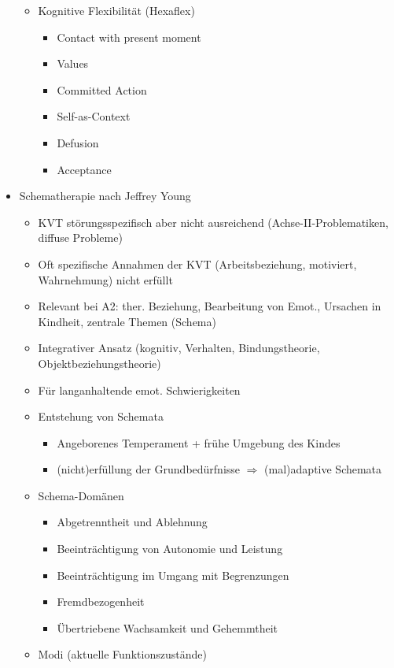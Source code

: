 \documentclass[11pt, paper=a4, twocolumn]{scrartcl}
\begin{document}
\begin{itemize}
\begin{itemize}
					\item Kognitive Flexibilität (Hexaflex)
						\begin{itemize}
							\item Contact with present moment
							\item Values
							\item Committed Action
							\item Self-as-Context
							\item Defusion
							\item Acceptance
						\end{itemize}
				\end{itemize}
			\item Schematherapie nach Jeffrey Young
				\begin{itemize}
					\item KVT störungsspezifisch aber nicht ausreichend (Achse-II-Problematiken, diffuse Probleme)
					\item Oft spezifische Annahmen der KVT (Arbeitsbeziehung, motiviert, Wahrnehmung) nicht erfüllt
					\item Relevant bei A2: ther. Beziehung, Bearbeitung von Emot., Ursachen in Kindheit, zentrale Themen (Schema)
					\item Integrativer Ansatz (kognitiv, Verhalten, Bindungstheorie, Objektbeziehungstheorie)
					\item Für langanhaltende emot. Schwierigkeiten
					\item Entstehung von Schemata
						\begin{itemize}
							\item Angeborenes Temperament + frühe Umgebung des Kindes
							\item (nicht)erfüllung der Grundbedürfnisse $\Rightarrow$ (mal)adaptive Schemata
						\end{itemize}
					\item Schema-Domänen
						\begin{itemize}
							\item Abgetrenntheit und Ablehnung
							\item Beeinträchtigung von Autonomie und Leistung
							\item Beeinträchtigung im Umgang mit Begrenzungen
							\item Fremdbezogenheit
							\item Übertriebene Wachsamkeit und Gehemmtheit
						\end{itemize}
					\item Modi (aktuelle Funktionszustände)

\end{itemize}
\end{itemize}
\end{document}
